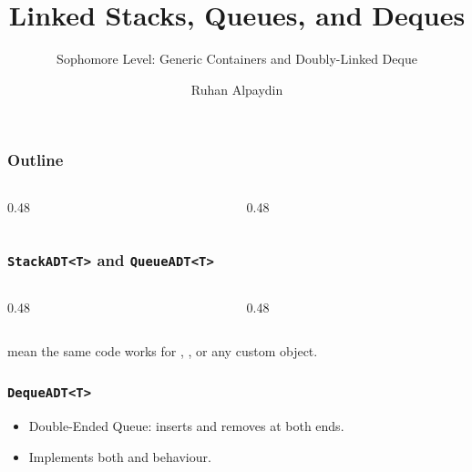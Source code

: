 \documentclass[aspectratio=169,10pt,compress]{beamer}
\title{Linked Stacks, Queues, and Deques}
\subtitle{Sophomore Level: Generic Containers and Doubly-Linked Deque}
\author[Bingol]{Ruhan Alpaydin}
\institute[FCIS]{Faculty of Computer and Information Sciences\\Yeditepe University}
\date{{\tiny \hbTimeStamp}}
\begin{document}
\begin{frame}[t,fragile]\titlepage\end{frame}

\begin{frame}[t,fragile]\frametitle{Outline}
  \begin{columns}[T]
    \begin{column}{0.48\textwidth}\tableofcontents[sections={1-3},hideallsubsections]\end{column}
    \begin{column}{0.48\textwidth}\tableofcontents[sections={4-5},hideallsubsections]\end{column}
  \end{columns}
\end{frame}

\begin{frame}[t,fragile]\frametitle{\texttt{StackADT<T>} and \texttt{QueueADT<T>}}
  \begin{columns}[T]
    \begin{column}{0.48\textwidth}
    \end{column}
    \begin{column}{0.48\textwidth}
    \end{column}
  \end{columns}
  \vspace{0.4em}
  \small
   mean the same code works for , , or any custom object.
\end{frame}

\begin{frame}[t,fragile]\frametitle{\texttt{DequeADT<T>}}
  \begin{itemize}\small
    \item Double-Ended Queue: inserts and removes at both ends.
    \item Implements both  and  behaviour.
  \end{itemize}
\end{frame}
\end{document}
